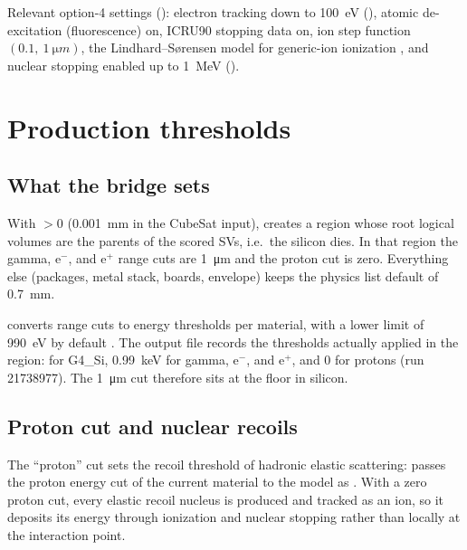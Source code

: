 Relevant option-4 settings (): electron tracking down to \SI{100}{eV} (), atomic de-excitation (fluorescence) on, ICRU90 stopping data on, ion step function $(0.1,\ \SI{1}{\micro m})$, the Lindhard--S{\o}rensen model for generic-ion ionization \citep{lindhard1996relativistic}, and nuclear stopping enabled up to \SI{1}{MeV} ().

\section{Production thresholds}

\subsection{What the bridge sets}
With  $>0$ (\SI{0.001}{mm} in the CubeSat input),  creates a region  whose root logical volumes are the parents of the scored SVs, i.e.\ the silicon dies. In that region the gamma, e$^-$, and e$^+$ range cuts are \SI{1}{\micro m} and the proton cut is zero. Everything else (packages, metal stack, boards, envelope) keeps the physics list default of \SI{0.7}{mm}.

\gfour{} converts range cuts to energy thresholds per material, with a lower limit of \SI{990}{eV} by default \citep{g4appdev}. The output file records the thresholds actually applied in the region: for G4\_Si, \SI{0.99}{keV} for gamma, e$^-$, and e$^+$, and 0 for protons (run 21738977). The \SI{1}{\micro m} cut therefore sits at the \gfour{} floor in silicon.

\subsection{Proton cut and nuclear recoils}
The ``proton'' cut sets the recoil threshold of hadronic elastic scattering:  passes the proton energy cut of the current material to the model as  \citep{g4source}. With a zero proton cut, every elastic recoil nucleus is produced and tracked as an ion, so it deposits its energy through ionization and nuclear stopping rather than locally at the interaction point.

